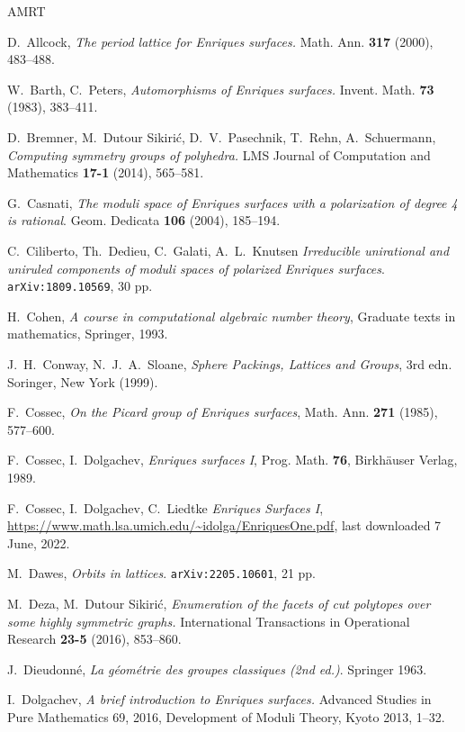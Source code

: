 \documentclass[a4paper,11pt]{article}
\begin{document}
\begin{thebibliography}{AMRT}

 D.~Allcock, {\it The period lattice for {Enriques} surfaces.}
Math. Ann. {\bf 317} (2000), 483--488.

  W.~Barth, C.~Peters, {\it Automorphisms of {Enriques} surfaces.}
 Invent. Math. {\bf 73} (1983), 383--411.

D.~Bremner, M.~Dutour Sikiri\'c, D.~V.~Pasechnik, T.~Rehn, A.~Schuer\-mann,
{\it Computing symmetry groups of polyhedra.}
LMS Journal of Computation and Mathematics {\bf 17-1} (2014), 565--581.

 G.~Casnati, {\it The moduli space of Enriques surfaces with a polarization of degree 4 is rational}.
Geom. Dedicata {\bf 106} (2004), 185--194.

 C.~Ciliberto, Th.~Dedieu, C.~Galati, A.~L.~Knutsen {\it Irreducible unirational and uniruled components of moduli spaces of polarized Enriques surfaces}.
{\tt arXiv:1809.10569}, 30 pp.

H.~Cohen, \textit{ A course in computational algebraic number theory}, Graduate texts in mathematics, Springer, 1993.

 J.~H.~Conway, N.~J.~A.~Sloane, {\it Sphere Packings, Lattices and Groups}, 3rd edn. Soringer, New York (1999).

 F.~Cossec, {\it On the {Picard} group of {Enriques} surfaces}, Math. Ann. {\bf 271} (1985), 577--600.

 F.~Cossec, I.~Dolgachev, {\it Enriques surfaces I}, Prog. Math. {\bf 76}, Birkh{\"a}user Verlag, 1989.

 F.~Cossec, I.~Dolgachev, C.~Liedtke {\it Enriques Surfaces I}, \url{https://www.math.lsa.umich.edu/~idolga/EnriquesOne.pdf}, last downloaded 7 June, 2022.

 M.~Dawes, {\it Orbits in lattices}.
{\tt arXiv:2205.10601}, 21 pp.

M.~Deza, M.~Dutour Sikiri\'c, {\em Enumeration of the facets of cut polytopes over some highly symmetric graphs.}
International Transactions in Operational Research {\bf 23-5} (2016), 853--860.

 J.~Dieudonn\'e, {\it La g\'eom\'etrie des groupes classiques (2nd ed.)}. Springer 1963.

 I.~Dolgachev, {\it A brief introduction to Enriques surfaces.} Advanced Studies in Pure Mathematics 69, 2016, Development of Moduli Theory, Kyoto 2013,  1--32.


\end{thebibliography}
\end{document}

